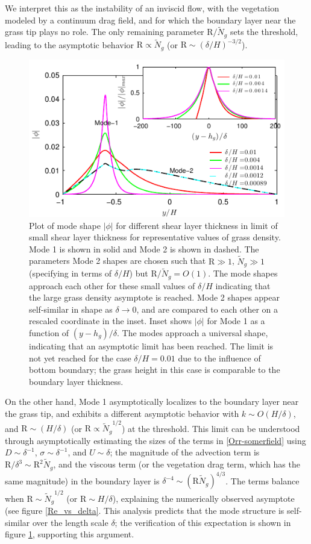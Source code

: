 \documentclass[aps,prl,reprint,twocolumn,showpacs,superscriptaddress,10pt]{revtex4-1}  %
\newcommand{\hg}{h_g}
\newcommand{\Rey}{\text{R}}
\newcommand{\Ndg}{\tilde{N}_g}
\begin{document}
We interpret this as the instability of an inviscid flow, with the vegetation modeled by a continuum drag field, and for which the boundary layer near the grass tip plays no role. The only remaining parameter $\Rey/\Ndg$ sets the threshold, leading to the asymptotic behavior $\Rey \propto \Ndg$ (or $\Rey \sim ({\delta}/{H})^{-3/2}$).


\begin{figure}
\includegraphics[]{Asymptotic_noshear}
\caption{Plot of mode shape $|\phi|$ for different shear layer thickness in limit of small shear layer thickness for representative values of grass density. Mode 1 is shown in solid and Mode 2 is shown in dashed. The parameters Mode 2 shapes are chosen such that $\Rey \gg 1$, $\Ndg \gg 1$ (specifying in terms of $\delta/H$) but $\Rey/\Ndg = O(1)$. The mode shapes approach each other for these small values of $\delta/H$ indicating that the large grass density asymptote is reached. Mode 2 shapes appear self-similar in shape as $\delta\to 0$, and are compared to each other on a rescaled coordinate in the inset. Inset shows $|\phi|$ for Mode 1 as a function of $(y-\hg)/\delta$. The modes approach a universal shape, indicating that an asymptotic limit has been reached. The limit is not yet reached for the case $\delta/H = 0.01$ due to the influence of bottom boundary; the grass height in this case is comparable to the boundary layer thickness.}
\label{Asymptotic_mode}
\end{figure}

On the other hand, Mode 1 asymptotically localizes to the boundary layer near the grass tip, and exhibits a different asymptotic behavior with $k \sim O(H/\delta)$, and $\Rey \sim (H/\delta)$ (or $\Rey \propto {\Ndg}^{1/2}$) at the threshold. 
This limit can be understood through asymptotically estimating the sizes of the terms in \eqref{Orr-somerfield} using $D\sim \delta^{-1}$, $\sigma \sim \delta^{-1}$, and $U\sim \delta$; the magnitude of the advection term is $\Rey/\delta^3 \sim \Rey^2 \Ndg $, and the viscous term (or the vegetation drag term, which has the same magnitude) in the boundary layer is $\delta^{-4} \sim (\Rey \Ndg)^{4/3}$. The terms balance when $\Rey \sim {\Ndg}^{1/2}$ (or $\Rey \sim H/\delta$), explaining the numerically observed asymptote (see figure \ref{Re_vs_delta}. This analysis predicts that the mode structure is self-similar over the length scale $\delta$; the verification of this expectation is shown in figure \ref{Asymptotic_mode}, supporting this argument.
\end{document}
